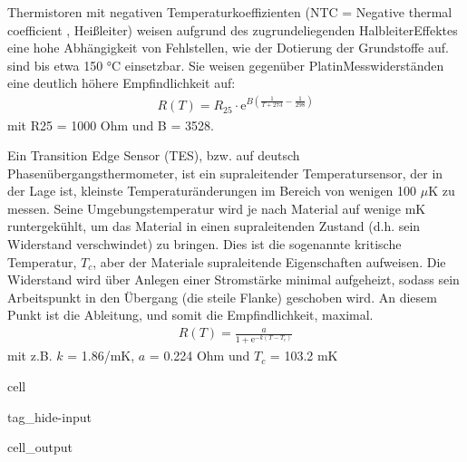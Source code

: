 \documentclass[letterpaper,10pt,english]{jupyterBook}
\begin{document}
\sphinxAtStartPar
Thermistoren mit negativen Temperaturkoeffizienten (NTC = Negative thermal coefficient , Heißleiter) weisen aufgrund des zugrundeliegenden Halbleiter\sphinxhyphen{}Effektes eine hohe Abhängigkeit von Fehlstellen, wie der Dotierung der Grundstoffe auf.
 sind bis etwa 150 °C einsetzbar.
Sie weisen gegenüber Platin\sphinxhyphen{}Messwiderständen eine deutlich höhere Empfindlichkeit auf:
\begin{equation*}
\begin{split} R(T)=R_{25} \cdot \mathrm e^{B\left(\frac{1}{T+273}-\frac{1}{298}\right)}\end{split}
\end{equation*}
\sphinxAtStartPar
mit R25 = 1000 Ohm und B = 3528.

\sphinxAtStartPar
Ein Transition Edge Sensor (TES), bzw. auf deutsch Phasenübergangsthermometer, ist ein supraleitender Temperatursensor, der in der Lage ist, kleinste Temperaturänderungen im Bereich von wenigen 100 \(\mu\mathrm K\) zu messen. Seine Umgebungstemperatur wird je nach Material auf wenige mK runtergekühlt, um das Material in einen supraleitenden Zustand (d.h. sein Widerstand verschwindet) zu bringen. Dies ist die sogenannte kritische Temperatur, \(T_c\), aber der Materiale supraleitende Eigenschaften aufweisen. Die Widerstand wird über Anlegen einer Stromstärke minimal aufgeheizt, sodass sein Arbeitspunkt in den Übergang (die steile Flanke) geschoben wird. An diesem Punkt ist die Ableitung, und somit die Empfindlichkeit, maximal.
\begin{equation*}
\begin{split} R(T)= \frac{a}{1 + \mathrm e^{-k(T-T_c)}} \end{split}
\end{equation*}
\sphinxAtStartPar
mit z.B. \(k\) = 1.86/mK, \(a\) = 0.224 Ohm und \(T_c\) = 103.2 mK

\sphinxAtStartPar
{}

\begin{sphinxuseclass}{cell}
\begin{sphinxuseclass}{tag_hide-input}\begin{sphinxVerbatimOutput}

\begin{sphinxuseclass}{cell_output}
\noindent{}

\end{sphinxuseclass}\end{sphinxVerbatimOutput}

\end{sphinxuseclass}
\end{sphinxuseclass}
\end{document}
